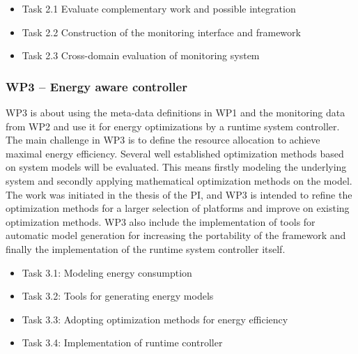 \documentclass{article}
\begin{document}
\begin{itemize}
\item Task 2.1 Evaluate complementary work and possible integration \vspace{-0.3cm}
\item Task 2.2 Construction of the monitoring interface and framework \vspace{-0.3cm}
\item Task 2.3 Cross-domain evaluation of monitoring system
\end{itemize}

\subsubsection{WP3 -- Energy aware controller}
WP3 is about using the meta-data definitions in WP1 and the monitoring data from WP2 and use it for energy optimizations by a runtime system controller.
The main challenge in WP3 is to define the resource allocation to achieve maximal energy efficiency.
Several well established optimization methods based on system models will be evaluated.
This means firstly modeling the underlying system and secondly applying mathematical optimization methods on the model.
The work was initiated in the thesis of the PI, and WP3 is intended to refine the optimization methods for a larger selection of platforms and improve on existing optimization methods.
WP3 also include the implementation of tools for automatic model generation for increasing the portability of the framework and finally the implementation of the runtime system controller itself.
\begin{itemize}
 \item Task 3.1: Modeling energy consumption \vspace{-0.3cm}
 \item Task 3.2: Tools for generating energy models \vspace{-0.3cm}
 \item Task 3.3: Adopting optimization methods for energy efficiency \vspace{-0.3cm}
 \item Task 3.4: Implementation of runtime controller
\end{itemize}
\end{document}
